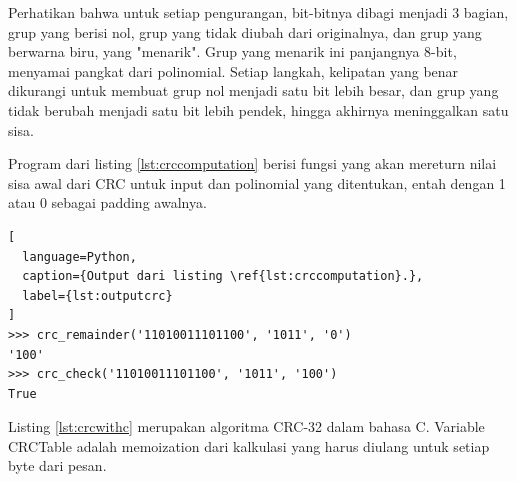 Perhatikan bahwa untuk setiap pengurangan, bit-bitnya dibagi menjadi 3 bagian, grup yang berisi nol, grup yang tidak diubah dari originalnya, dan grup yang berwarna biru, yang "menarik". Grup yang menarik ini panjangnya 8-bit, menyamai pangkat dari polinomial. Setiap langkah, kelipatan yang benar dikurangi untuk membuat grup nol menjadi satu bit lebih besar, dan grup yang tidak berubah menjadi satu bit lebih pendek, hingga akhirnya meninggalkan satu sisa.



Program dari listing \ref{lst:crccomputation} berisi fungsi yang akan mereturn nilai sisa awal dari CRC untuk input dan polinomial yang ditentukan, entah dengan 1 atau 0 sebagai padding awalnya.

\begin{lstlisting}[
  language=Python,
  caption={Output dari listing \ref{lst:crccomputation}.},
  label={lst:outputcrc}
]
>>> crc_remainder('11010011101100', '1011', '0')
'100'
>>> crc_check('11010011101100', '1011', '100')
True
\end{lstlisting}



Listing \ref{lst:crcwithc} merupakan algoritma CRC-32 \citep{microsoft2019} dalam bahasa C. Variable CRCTable adalah memoization dari kalkulasi yang harus diulang untuk setiap byte dari pesan.
